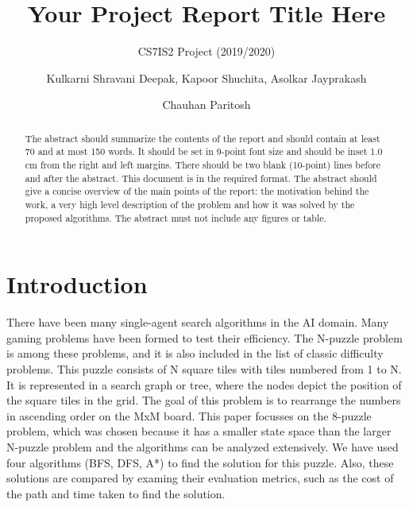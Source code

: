 \documentclass{svproc}
\begin{document}
\mainmatter
\title{Your Project Report Title Here
}
\subtitle{CS7IS2 Project (2019/2020)}
\author{Kulkarni Shravani Deepak, Kapoor Shuchita, Asolkar Jayprakash \and Chauhan Paritosh}


\maketitle              %

\begin{abstract}
The abstract should summarize the contents of the report and should contain at least 70 and at most 150 words. It should be set in 9-point font size and should be inset 1.0 cm from the right and left margins. There should be two blank (10-point) lines before and after the abstract. This document is in the required format. The abstract should give a concise overview of the main points of the report: the motivation behind the work, a very high level description of the problem and how it was solved by the proposed algorithms. The abstract must not include any figures or table.
\end{abstract}
%

 

\section{Introduction}
There have been many single-agent search algorithms in the AI domain. Many gaming problems have been formed to test their efficiency. The N-puzzle problem is among these problems, and it is also included in the list of classic difficulty problems. This puzzle consists of N square tiles with tiles numbered from 1 to N. It is represented in a search graph or tree, where the nodes depict the position of the square tiles in the grid. The goal of this problem is to rearrange the numbers in ascending order on the MxM board. This paper focusses on the 8-puzzle problem, which was chosen because it has a smaller state space than the larger N-puzzle problem and the algorithms can be analyzed extensively. We have used four algorithms (BFS, DFS, A*) to find the solution for this puzzle.  Also, these solutions are compared by examing their evaluation metrics, such as the cost of the path and time taken to find the solution. \\
\end{document}

